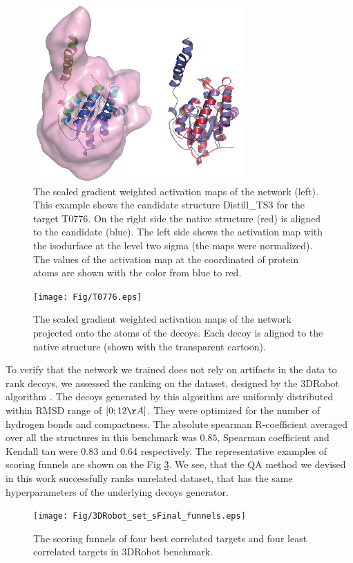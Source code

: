 \begin{figure}[H]
    \centering
    \includegraphics[width=0.5\linewidth]{Fig/FigT0776.eps}
    \caption{The scaled gradient weighted activation maps of the network (left). 
    This example shows the candidate structure Distill\_TS3 for 
    the target T0776. On the right side the native structure (red) is aligned to the candidate (blue). The left side shows the activation 
    map with the isodurface at the level two sigma (the maps were normalized). The values of the activation map at the coordinated of protein
    atoms are shown with the color from blue to red.}
    \label{Fig:GradCAMT0776}
\end{figure}

\begin{figure}[H]
    \centering
    \texttt{[image: Fig/T0776.eps]}
    \caption{The scaled gradient weighted activation maps of the network projected onto the atoms of the decoys. 
    Each decoy is aligned to the native structure (shown with the transparent cartoon).}
    \label{Fig:GradCAMT0776_more}
\end{figure}

To verify that the network we trained does not rely on artifacts in the data to rank decoys, we assessed the ranking on the dataset, designed 
by the 3DRobot algorithm \cite{deng20163drobot}. The decoys generated by this algorithm are 
uniformly distributed within RMSD range of $[0; 12\AA]$. They 
were optimized for the number of hydrogen bonds and compactness.
The absolute spearman R-coefficient averaged over all the structures in this benchmark was $0.85$, Spearman coefficient and Kendall tau were
0.83 and 0.64 respectively. The representative examples of scoring funnels are shown on the Fig \ref{Fig:3DRobotBenchmark}. 
We see, that the QA method we devised
in this work successfully ranks unrelated dataset, that has the same hyperparameters of the underlying decoys generator.

\begin{figure}[H]
    \centering
    \texttt{[image: Fig/3DRobot\_set\_sFinal\_funnels.eps]}
    \caption{The scoring funnels of four best correlated targets and four least correlated targets in 3DRobot benchmark.}
    \label{Fig:3DRobotBenchmark}
\end{figure}